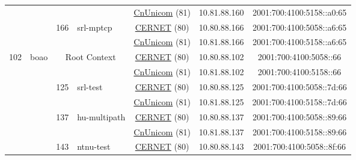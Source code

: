 \begin{small}
\begin{center}
\begin{longtable}{|c|c|c|c|c|c|c|c|}
  &  &  &  & \multicolumn{2}{|c|}{\tiny{\href{http://www.chinaunicom.com}{CnUnicom} (81)}} & \tiny{10.81.88.160} & \tiny{2001:700:4100:5158::a0:65} \\* \cline{3-3}\cline{4-4}\cline{5-5}\cline{6-6}\cline{7-7}\cline{8-8}
  &  & \multirow{2}{*}{\tiny{166}} & \multicolumn{1}{|l|}{\multirow{2}{*}{\tiny{srl-mptcp}}} & \multicolumn{2}{|c|}{\tiny{\href{http://www.cernet.edu.cn}{CERNET} (80)}} & \tiny{10.80.88.166} & \tiny{2001:700:4100:5058::a6:65} \\* \cline{5-5}\cline{6-6}\cline{7-7}\cline{8-8}
  &  &  &  & \multicolumn{2}{|c|}{\tiny{\href{http://www.chinaunicom.com}{CnUnicom} (81)}} & \tiny{10.81.88.166} & \tiny{2001:700:4100:5158::a6:65} \\ \hline
 \multirow{12}{*}{\tiny{102}} & \multicolumn{1}{|l|}{\multirow{12}{*}{\tiny{boao}}} & \multicolumn{2}{|c|}{\multirow{2}{*}{\tiny{Root Context}}} & \multicolumn{2}{|c|}{\tiny{\href{http://www.cernet.edu.cn}{CERNET} (80)}} & \tiny{10.80.88.102} & \tiny{2001:700:4100:5058::66} \\* \cline{5-5}\cline{6-6}\cline{7-7}\cline{8-8}
  &  & \multicolumn{2}{|c|}{} & \multicolumn{2}{|c|}{\tiny{\href{http://www.chinaunicom.com}{CnUnicom} (81)}} & \tiny{10.81.88.102} & \tiny{2001:700:4100:5158::66} \\* \cline{3-3}\cline{4-4}\cline{5-5}\cline{6-6}\cline{7-7}\cline{8-8}
  &  & \multirow{2}{*}{\tiny{125}} & \multicolumn{1}{|l|}{\multirow{2}{*}{\tiny{srl-test}}} & \multicolumn{2}{|c|}{\tiny{\href{http://www.cernet.edu.cn}{CERNET} (80)}} & \tiny{10.80.88.125} & \tiny{2001:700:4100:5058::7d:66} \\* \cline{5-5}\cline{6-6}\cline{7-7}\cline{8-8}
  &  &  &  & \multicolumn{2}{|c|}{\tiny{\href{http://www.chinaunicom.com}{CnUnicom} (81)}} & \tiny{10.81.88.125} & \tiny{2001:700:4100:5158::7d:66} \\* \cline{3-3}\cline{4-4}\cline{5-5}\cline{6-6}\cline{7-7}\cline{8-8}
  &  & \multirow{2}{*}{\tiny{137}} & \multicolumn{1}{|l|}{\multirow{2}{*}{\tiny{hu-multipath}}} & \multicolumn{2}{|c|}{\tiny{\href{http://www.cernet.edu.cn}{CERNET} (80)}} & \tiny{10.80.88.137} & \tiny{2001:700:4100:5058::89:66} \\* \cline{5-5}\cline{6-6}\cline{7-7}\cline{8-8}
  &  &  &  & \multicolumn{2}{|c|}{\tiny{\href{http://www.chinaunicom.com}{CnUnicom} (81)}} & \tiny{10.81.88.137} & \tiny{2001:700:4100:5158::89:66} \\* \cline{3-3}\cline{4-4}\cline{5-5}\cline{6-6}\cline{7-7}\cline{8-8}
  &  & \multirow{2}{*}{\tiny{143}} & \multicolumn{1}{|l|}{\multirow{2}{*}{\tiny{ntnu-test}}} & \multicolumn{2}{|c|}{\tiny{\href{http://www.cernet.edu.cn}{CERNET} (80)}} & \tiny{10.80.88.143} & \tiny{2001:700:4100:5058::8f:66} \\* \cline{5-5}\cline{6-6}\cline{7-7}\cline{8-8}

\end{longtable}
\end{center}
\end{small}
